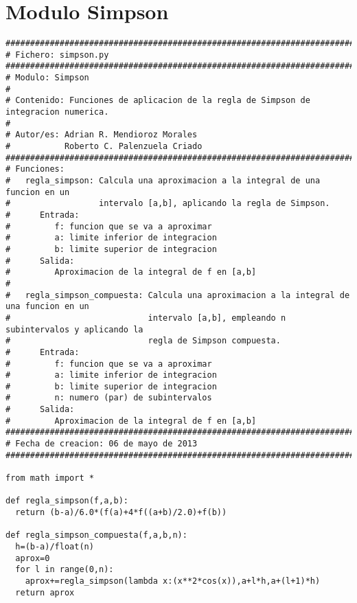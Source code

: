 \section{Modulo Simpson}
\label{Apendice2:Simpson}

\begin{center}
\begin{footnotesize}
\begin{verbatim}
##################################################################################
# Fichero: simpson.py
###################################################################################
# Modulo: Simpson 
#
# Contenido: Funciones de aplicacion de la regla de Simpson de integracion numerica. 
#
# Autor/es: Adrian R. Mendioroz Morales
#           Roberto C. Palenzuela Criado
###################################################################################
# Funciones:
#   regla_simpson: Calcula una aproximacion a la integral de una funcion en un 
#                  intervalo [a,b], aplicando la regla de Simpson.
#      Entrada:
#         f: funcion que se va a aproximar
#         a: limite inferior de integracion
#         b: limite superior de integracion
#      Salida:
#         Aproximacion de la integral de f en [a,b]
# 
#   regla_simpson_compuesta: Calcula una aproximacion a la integral de una funcion en un 
#                            intervalo [a,b], empleando n subintervalos y aplicando la 
#                            regla de Simpson compuesta.
#      Entrada:
#         f: funcion que se va a aproximar
#         a: limite inferior de integracion
#         b: limite superior de integracion
#         n: numero (par) de subintervalos
#      Salida:
#         Aproximacion de la integral de f en [a,b]
###################################################################################
# Fecha de creacion: 06 de mayo de 2013
###################################################################################

from math import *

def regla_simpson(f,a,b):
  return (b-a)/6.0*(f(a)+4*f((a+b)/2.0)+f(b))
  
def regla_simpson_compuesta(f,a,b,n):
  h=(b-a)/float(n)
  aprox=0
  for l in range(0,n):
    aprox+=regla_simpson(lambda x:(x**2*cos(x)),a+l*h,a+(l+1)*h)
  return aprox
\end{verbatim}
\end{footnotesize}
\end{center}

